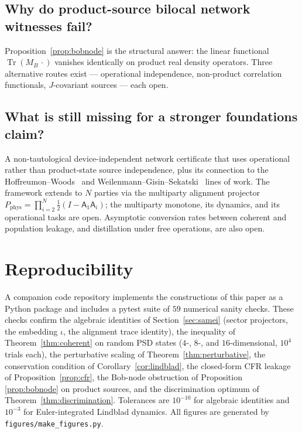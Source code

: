 \documentclass[a4paper,onecolumn,noarxiv]{quantumarticle}
\theoremstyle{plain}
\theoremstyle{definition}
\theoremstyle{remark}
\newcommand{\Aop}{\mathsf{A}}
\newcommand{\Mop}{M}
\newcommand{\Tr}{\operatorname{Tr}}
\begin{document}
\subsection{Why do product-source bilocal network witnesses fail?}

Proposition~\ref{prop:bobnode} is the structural answer: the linear functional
$\Tr(\Mop_B\,\cdot)$ vanishes identically on product real density operators.
Three alternative routes exist --- operational independence, non-product correlation
functionals, $J$-covariant sources --- each open.

\subsection{What is still missing for a stronger foundations claim?}

A non-tautological device-independent network certificate that uses operational
rather than product-state source independence, plus its connection to the
Hoffreumon--Woods~\cite{HoffreumonWoods2025,HoffreumonWoodsNonFalsified} and
Weilenmann--Gisin--Sekatski~\cite{WeilenmannGisinSekatski2025} lines of work. The
framework extends to $N$ parties via the multiparty alignment projector
$P_{\mathrm{phys}}=\prod_{i=2}^N\tfrac{1}{2}(I-\Aop_1\Aop_i)$; the multiparty
monotone, its dynamics, and its operational tasks are open. Asymptotic conversion
rates between coherent and population leakage, and distillation under free
operations, are also open.

\section{Reproducibility}
\label{sec:reproducibility}

A companion code repository implements the constructions of this paper as a Python
package and includes a pytest suite of $59$ numerical sanity checks. These checks
confirm the algebraic identities of Section~\ref{sec:samei} (sector projectors, the
embedding $\iota$, the alignment trace identity), the inequality of
Theorem~\ref{thm:coherent} on random PSD states ($4$-, $8$-, and $16$-dimensional,
$10^4$ trials each), the perturbative scaling of Theorem~\ref{thm:perturbative}, the
conservation condition of Corollary~\ref{cor:lindblad}, the closed-form CFR leakage
of Proposition~\ref{prop:cfr}, the Bob-node obstruction of Proposition~%
\ref{prop:bobnode} on product sources, and the discrimination optimum of
Theorem~\ref{thm:discrimination}. Tolerances are $10^{-10}$ for algebraic identities
and $10^{-3}$ for Euler-integrated Lindblad dynamics. All figures are generated by
\texttt{figures/make\_figures.py}.
\end{document}
